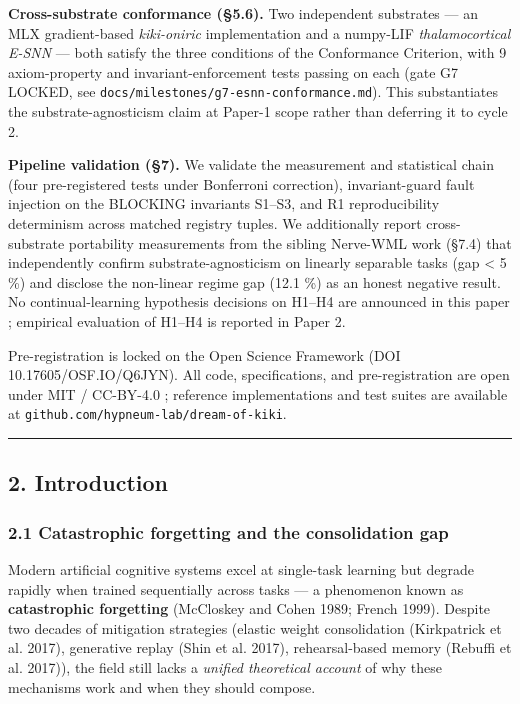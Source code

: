 \documentclass[
]{article}
\begin{document}
\textbf{Cross-substrate conformance (§5.6).} Two independent substrates
--- an MLX gradient-based \emph{kiki-oniric} implementation and a
numpy-LIF \emph{thalamocortical E-SNN} --- both satisfy the three
conditions of the Conformance Criterion, with 9 axiom-property and
invariant-enforcement tests passing on each (gate G7 LOCKED, see
\texttt{docs/milestones/g7-esnn-conformance.md}). This substantiates the
substrate-agnosticism claim at Paper-1 scope rather than deferring it to
cycle 2.

\textbf{Pipeline validation (§7).} We validate the measurement and
statistical chain (four pre-registered tests under Bonferroni
correction), invariant-guard fault injection on the BLOCKING invariants
S1--S3, and R1 reproducibility determinism across matched registry
tuples. We additionally report cross-substrate portability measurements
from the sibling Nerve-WML work (§7.4) that independently confirm
substrate-agnosticism on linearly separable tasks (gap \textless{} 5 \%)
and disclose the non-linear regime gap (12.1 \%) as an honest negative
result. No continual-learning hypothesis decisions on H1--H4 are
announced in this paper ; empirical evaluation of H1--H4 is reported in
Paper 2.

Pre-registration is locked on the Open Science Framework (DOI
10.17605/OSF.IO/Q6JYN). All code, specifications, and pre-registration
are open under MIT / CC-BY-4.0 ; reference implementations and test
suites are available at \texttt{github.com/hypneum-lab/dream-of-kiki}.

\begin{center}\rule{0.5\linewidth}{0.5pt}\end{center}

\subsection{2. Introduction}\label{introduction}

\subsubsection{2.1 Catastrophic forgetting and the consolidation
gap}\label{catastrophic-forgetting-and-the-consolidation-gap}

Modern artificial cognitive systems excel at single-task learning but
degrade rapidly when trained sequentially across tasks --- a phenomenon
known as \textbf{catastrophic forgetting} (McCloskey and Cohen 1989;
French 1999). Despite two decades of mitigation strategies (elastic
weight consolidation ({Kirkpatrick et al.} 2017), generative replay
(Shin et al. 2017), rehearsal-based memory (Rebuffi et al. 2017)), the
field still lacks a \emph{unified theoretical account} of why these
mechanisms work and when they should compose.
\end{document}
